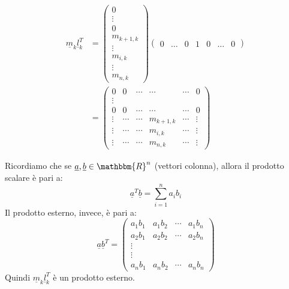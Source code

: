 \documentclass[12pt]{report}
\begin{document}
\begin{note}{}{}
\begin{align*}
\underline{m}_k\underline{l}_k^T &= \begin{pmatrix}
	0 \\
	\vdots \\
	0 \\
	m_{k+1, k} \\
	\vdots \\
	m_{i, k} \\
	\vdots \\
	m_{n, k}
\end{pmatrix}\begin{pmatrix}
	0 & \dots & 0 & 1 & 0 & \dots & 0
\end{pmatrix} \\
&= \begin{pmatrix}
	0 & 0 & \cdots & \cdots & \cdots & 0 \\
	\vdots \\
	0 & 0 & \cdots & \cdots & \cdots & 0 \\
	\vdots & \cdots & \cdots & m_{k+1, k} & \cdots & \vdots \\
	\vdots & \cdots & \cdots & m_{i, k} & \cdots & \vdots \\
	\vdots & \cdots & \cdots & m_{n, k} & \cdots & \vdots
\end{pmatrix}
\end{align*}
\end{note}
Ricordiamo che se $\underline{a}, \underline{b} \in \mathbbm{R}^n$ (vettori colonna), allora il prodotto scalare è pari a:
\[
\underline{a}^T\underline{b} = \sum_{i=1}^{n}a_ib_i
\]
Il prodotto esterno, invece, è pari a:
\[
\underline{a}\underline{b}^T = \begin{pmatrix}
	a_1b_1 & a_1b_2 & \cdots & a_1b_n \\
	a_2b_1 & a_2b_2 & \cdots & a_2b_n \\
	\vdots \\
	\vdots \\
	a_nb_1 & a_nb_2 & \cdots  & a_nb_n
\end{pmatrix}
\]
Quindi $\underline{m}_k\underline{l}_k^T$ è un prodotto esterno.
\end{document}
